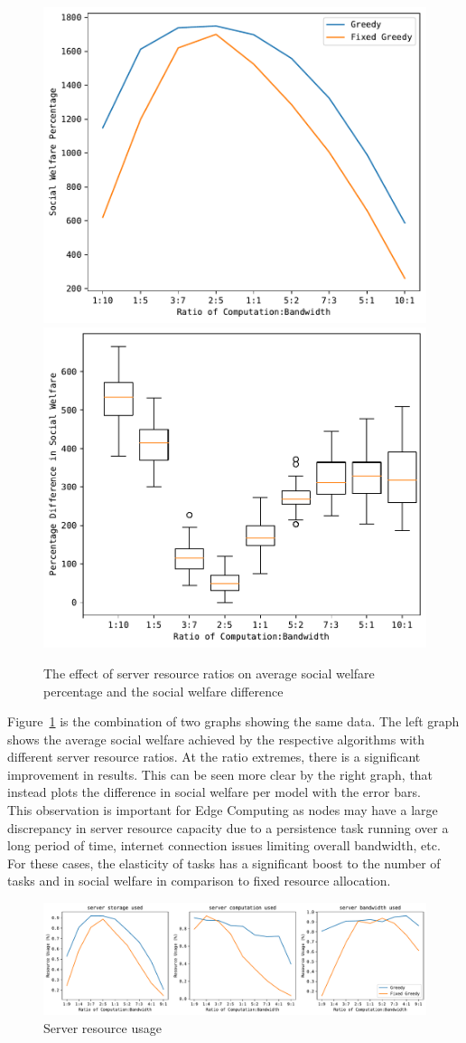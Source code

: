 \begin{figure}[h]
    \centering
    \includegraphics[width=0.45\linewidth]{figs/resource_ratio/social_welfare.pdf}
    \includegraphics[width=0.45\linewidth]{figs/resource_ratio/social_welfare_difference.pdf}
    \caption{The effect of server resource ratios on average social welfare percentage and the social welfare difference}
    \label{fig:resource-ratio-social-welfare}
\end{figure}

Figure~\ref{fig:resource-ratio-social-welfare} is the combination of two graphs showing the same data. The left graph
shows the average social welfare achieved by the respective algorithms with different server resource ratios. At the
ratio extremes, there is a significant improvement in results. This can be seen more clear by the right graph, that
instead plots the difference in social welfare per model with the error bars. \\
This observation is important for Edge Computing as nodes may have a large discrepancy in server resource capacity
due to a persistence task running over a long period of time, internet connection issues limiting overall bandwidth,
etc. For these cases, the elasticity of tasks has a significant boost to the number of tasks and in social
welfare in comparison to fixed resource allocation.

\begin{figure}[h]
    \centering
    \includegraphics[width=\linewidth]{figs/resource_ratio/server_resource_usage.pdf}
    \caption{Server resource usage}
    \label{fig:resource-ratio-server-resource-usage}
\end{figure}

